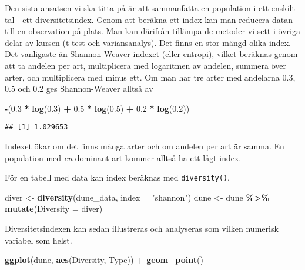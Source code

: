 \documentclass[
]{book}
\newenvironment{Shaded}{\begin{snugshade}}{\end{snugshade}}
\newcommand{\AttributeTok}[1]{\textcolor[rgb]{0.13,0.29,0.53}{#1}}
\newcommand{\FloatTok}[1]{\textcolor[rgb]{0.00,0.00,0.81}{#1}}
\newcommand{\FunctionTok}[1]{\textcolor[rgb]{0.13,0.29,0.53}{\textbf{#1}}}
\newcommand{\NormalTok}[1]{#1}
\newcommand{\OtherTok}[1]{\textcolor[rgb]{0.56,0.35,0.01}{#1}}
\newcommand{\SpecialCharTok}[1]{\textcolor[rgb]{0.81,0.36,0.00}{\textbf{#1}}}
\newcommand{\StringTok}[1]{\textcolor[rgb]{0.31,0.60,0.02}{#1}}
\theoremstyle{definition}
\theoremstyle{definition}
\theoremstyle{definition}
\theoremstyle{definition}
\theoremstyle{remark}
\begin{document}
Den sista ansatsen vi ska titta på är att sammanfatta en population i ett enskilt tal - ett diversitetsindex. Genom att beräkna ett index kan man reducera datan till en observation på plats. Man kan därifrån tillämpa de metoder vi sett i övriga delar av kursen (t-test och variansanalys). Det finns en stor mängd olika index. Det vanligaste än Shannon-Weaver indexet (eller entropi), vilket beräknas genom att ta andelen per art, multiplicera med logaritmen av andelen, summera över arter, och multiplicera med minus ett. Om man har tre arter med andelarna 0.3, 0.5 och 0.2 ges Shannon-Weaver alltså av

\begin{Shaded}
\begin{Highlighting}[]
\SpecialCharTok{{-}}\NormalTok{(}\FloatTok{0.3} \SpecialCharTok{*} \FunctionTok{log}\NormalTok{(}\FloatTok{0.3}\NormalTok{) }\SpecialCharTok{+} \FloatTok{0.5} \SpecialCharTok{*} \FunctionTok{log}\NormalTok{(}\FloatTok{0.5}\NormalTok{) }\SpecialCharTok{+} \FloatTok{0.2} \SpecialCharTok{*} \FunctionTok{log}\NormalTok{(}\FloatTok{0.2}\NormalTok{))}
\end{Highlighting}
\end{Shaded}

\begin{verbatim}
## [1] 1.029653
\end{verbatim}

Indexet ökar om det finns många arter och om andelen per art är samma. En population med \emph{en} dominant art kommer alltså ha ett lågt index.

För en tabell med data kan index beräknas med \texttt{diversity()}.

\begin{Shaded}
\begin{Highlighting}[]
\NormalTok{diver }\OtherTok{\textless{}{-}} \FunctionTok{diversity}\NormalTok{(dune\_data, }\AttributeTok{index =} \StringTok{"shannon"}\NormalTok{)}
\NormalTok{dune }\OtherTok{\textless{}{-}}\NormalTok{ dune }\SpecialCharTok{\%\textgreater{}\%} \FunctionTok{mutate}\NormalTok{(}\AttributeTok{Diversity =}\NormalTok{ diver)}
\end{Highlighting}
\end{Shaded}

Diversitetsindexen kan sedan illustreras och analyseras som vilken numerisk variabel som helst.

\begin{Shaded}
\begin{Highlighting}[]
\FunctionTok{ggplot}\NormalTok{(dune, }\FunctionTok{aes}\NormalTok{(Diversity, Type)) }\SpecialCharTok{+} \FunctionTok{geom\_point}\NormalTok{()}
\end{Highlighting}
\end{Shaded}
\end{document}
